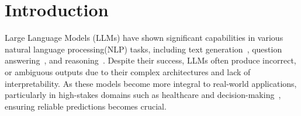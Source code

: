 
\section{Introduction}\label{sec:intro}







Large Language Models (LLMs) have shown significant capabilities in various natural language processing(NLP) tasks, including text generation~\cite{mo2024large}, question answering~\cite{zhuang2023toolqa}, and reasoning~\cite{sharan2023llm}. Despite their success, LLMs often produce incorrect, or ambiguous outputs due to their complex architectures and lack of interpretability. As these models become more integral to real-world applications, particularly in high-stakes domains such as healthcare and decision-making~\cite{yao2024comal}, ensuring reliable predictions becomes crucial.


